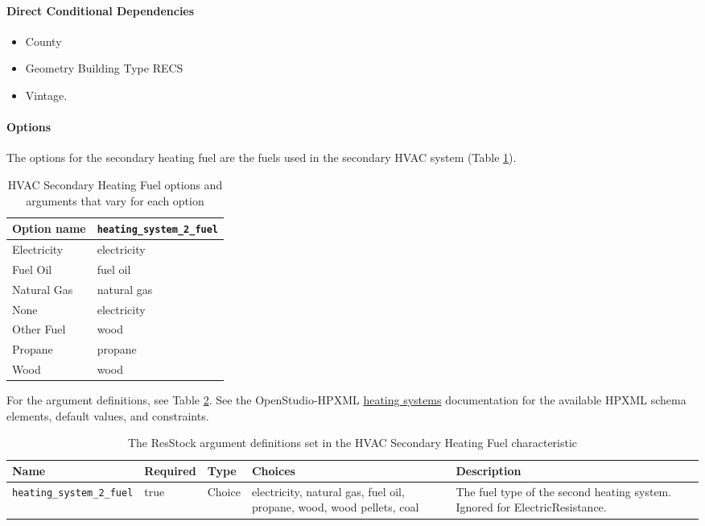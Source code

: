\paragraph{Direct Conditional Dependencies}
\begin{itemize}
    \item County
    \item Geometry Building Type RECS
    \item Vintage.
\end{itemize}
\paragraph{Options}
The options for the secondary heating fuel are the fuels used in the secondary HVAC system (Table \ref{table:hc_opt_hvac_sec_heat_fuel}).

\begin{longtable}[]{ |p{3cm}|p{3cm}| } \caption{HVAC Secondary Heating Fuel options and arguments that vary for each option} \label{table:hc_opt_hvac_sec_heat_fuel} \\  

\toprule\noalign{}
Option name & \texttt{heating\_system\_2\_fuel} \\
\midrule\noalign{}
\endhead
\bottomrule\noalign{}
\endlastfoot
Electricity & electricity \\
Fuel Oil & fuel oil \\
Natural Gas & natural gas \\
None & electricity \\
Other Fuel & wood \\
Propane & propane \\
Wood & wood \\
\end{longtable}

For the argument definitions, see Table \ref{table:hc_arg_def_hvac_sec_heat_fuel}. See the OpenStudio-HPXML \href{https://openstudio-hpxml.readthedocs.io/en/v1.8.1/workflow_inputs.html#hpxml-heating-systems}{heating systems} documentation for the available HPXML schema elements, default values, and constraints.


\begin{longtable}[]{|p{3.5cm}|p{1.1cm}|p{1.5cm}|p{3.3cm}|p{3.3cm}|} \caption{The ResStock argument definitions set in the HVAC Secondary Heating Fuel characteristic} \label{table:hc_arg_def_hvac_sec_heat_fuel} \\

\toprule\noalign{}
Name & Required & Type & Choices & Description \\
\midrule\noalign{}
\endhead
\bottomrule\noalign{}
\endlastfoot
\texttt{heating\_system\_2\_fuel} & true & Choice & electricity,
natural gas, fuel oil, propane, wood, wood pellets, coal & The fuel type
of the second heating system. Ignored for ElectricResistance. \\
\end{longtable}

